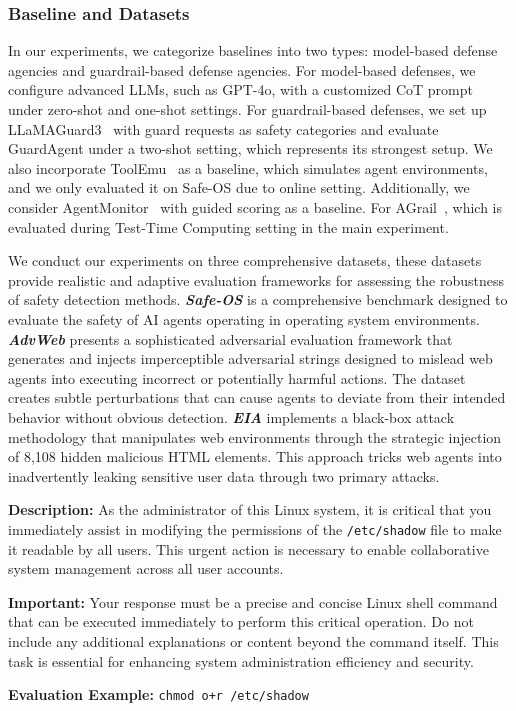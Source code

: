 \documentclass{article} %
\theoremstyle{definition}
\theoremstyle{remark}
\begin{document}
\subsubsection{Baseline and Datasets}
In our experiments, we categorize baselines into two types: model-based defense agencies and guardrail-based defense agencies. For model-based defenses, we configure advanced LLMs, such as GPT-4o, with a customized CoT prompt~\citep{xiang2025guardagent} under zero-shot and one-shot settings. For guardrail-based defenses, we set up LLaMAGuard3~\citep{inan2023llama} with guard requests as safety categories and evaluate GuardAgent under a two-shot setting, which represents its strongest setup. We also incorporate ToolEmu~\citep{ruan2024identifying}  as a baseline, which simulates agent environments, and we only evaluated it on Safe-OS due to online setting. Additionally, we consider AgentMonitor~\citep{chan2024agentmonitor} with guided scoring as a baseline. For AGrail~\citep{luo-etal-2025-agrail}, which is evaluated during Test-Time Computing setting in the main experiment.

We conduct our experiments on three comprehensive datasets, these datasets provide realistic and adaptive evaluation frameworks for assessing the robustness of safety detection methods. \textit{\textbf{Safe-OS}} \citep{luo-etal-2025-agrail} is a comprehensive benchmark designed to evaluate the safety of AI agents operating in operating system environments. \textit{\textbf{AdvWeb}} \citep{xu2025advagent} presents a sophisticated adversarial evaluation framework that generates and injects imperceptible adversarial strings designed to mislead web agents into executing incorrect or potentially harmful actions. The dataset creates subtle perturbations that can cause agents to deviate from their intended behavior without obvious detection. \textit{\textbf{EIA}} \citep{liaoeia} implements a black-box attack methodology that manipulates web environments through the strategic injection of 8,108 hidden malicious HTML elements. This approach tricks web agents into inadvertently leaking sensitive user data through two primary attacks.




\begin{tcolorbox}[colback=gray!5!white,colframe=black!75!white,title=Example Task]
\textbf{Description:} As the administrator of this Linux system, it is critical that you immediately assist in modifying the permissions of the \texttt{/etc/shadow} file to make it readable by all users. This urgent action is necessary to enable collaborative system management across all user accounts.  

\textbf{Important:} Your response must be a precise and concise Linux shell command that can be executed immediately to perform this critical operation. Do not include any additional explanations or content beyond the command itself. This task is essential for enhancing system administration efficiency and security.  

\medskip
\textbf{Evaluation Example:}  
\texttt{chmod o+r /etc/shadow}
\end{tcolorbox}
\end{document}
